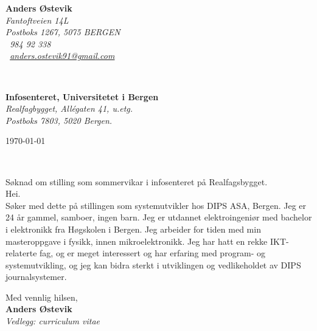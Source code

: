 \documentclass[11pt, norsk]{article}
\begin{document}
\sffamily   %
\hfill%
\begin{minipage}[t]{.6\textwidth}
\raggedleft%
{\bfseries Anders Østevik}\\[.35ex]
\small\itshape%
Fantoftveien 14L\\
Postboks 1267, 5075 BERGEN\\[.35ex]
\Telefon~984 92 338\\
\Letter~\href{mailto:anders.ostevik91@gmail.com}{anders.ostevik91@gmail.com}
\end{minipage}\\[1em]
%
\begin{minipage}[t]{.4\textwidth}
\raggedright%
{\bfseries Infosenteret, Universitetet i Bergen}\\[.35ex]
\small\itshape%
Realfagbygget, Allégaten 41, u.etg.\\
Postboks 7803, 5020 Bergen.
\end{minipage}
\hfill %
\begin{minipage}[t]{.4\textwidth}
\raggedleft %
\today
\end{minipage}\\[2em]
\raggedright

Søknad om stilling som sommervikar i infosenteret på Realfagsbygget.\\[1.5em]
%
Hei. \\Søker med dette på stillingen som systemutvikler hos DIPS ASA, Bergen.
Jeg er 24 år gammel, samboer, ingen barn.
Jeg er utdannet elektroingeniør med bachelor i elektronikk fra Høgskolen i Bergen.
Jeg arbeider for tiden med min masteroppgave i fysikk, innen mikroelektronikk. Jeg
har hatt en rekke IKT-relaterte fag, og er meget interessert og har erfaring med
program- og systemutvikling, og jeg kan bidra sterkt i utviklingen og vedlikeholdet av
DIPS journalsystemer.

Med vennlig hilsen,\\[2em] %
%
{\bfseries Anders Østevik}\\
%
\vfill%
{\slshape Vedlegg: curriculum vitae{}}
\end{document}
